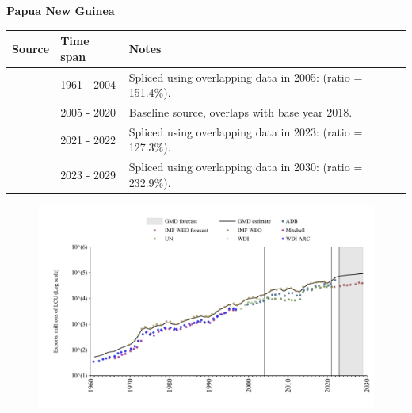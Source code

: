 \documentclass[12pt,a4paper,landscape]{article}
\begin{document}
\begin{adjustbox}{max totalsize={\paperwidth}{\paperheight},center}
\begin{minipage}[t][\textheight][t]{\textwidth}
\vspace*{0.5cm}
{}
\begin{center}
{\Large\bfseries Papua New Guinea}
\end{center}
\vspace{0.5cm}
\begin{table}[H]
\centering
\small
\begin{tabular}{|l|l|l|}
\hline
\textbf{Source} & \textbf{Time span} & \textbf{Notes} \\
\hline
\rowcolor{white}\cite{WDI}& 1961 - 2004 &Spliced using overlapping data in 2005: (ratio = 151.4\%).\\
\rowcolor{lightgray}\cite{UN}& 2005 - 2020 &Baseline source, overlaps with base year 2018.\\
\rowcolor{white}\cite{ADB}& 2021 - 2022 &Spliced using overlapping data in 2023: (ratio = 127.3\%).\\
\rowcolor{lightgray}\cite{IMF_WEO_forecast}& 2023 - 2029 &Spliced using overlapping data in 2030: (ratio = 232.9\%).\\
\hline
\end{tabular}
\end{table}
\begin{figure}[H]
\centering
\includegraphics[width=\textwidth,height=0.6\textheight,keepaspectratio]{graphs/PNG_exports.pdf}
\end{figure}
\end{minipage}
\end{adjustbox}
\end{document}
